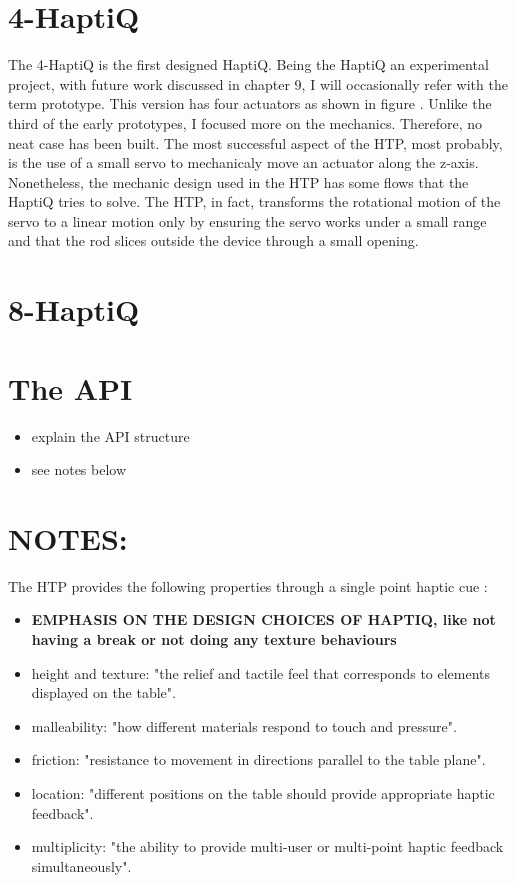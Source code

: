\section{4-HaptiQ}
The 4-HaptiQ is the first designed HaptiQ. Being the HaptiQ an experimental project, with future work discussed in chapter 9, I will occasionally refer with the term prototype. This version has four actuators as shown in figure . Unlike the third of the early prototypes, I focused more on the mechanics. Therefore, no neat case has been built. 
The most successful aspect of the HTP, most probably, is the use of a small servo to mechanicaly move an actuator along the z-axis. Nonetheless, the mechanic design used in the HTP has some flows that the HaptiQ tries to solve. The HTP, in fact, transforms the rotational motion of the servo to a linear motion only by ensuring the servo works under a small range and that the rod slices outside the device through a small opening. 


\section{8-HaptiQ}

\section{The API}

\begin{itemize}
	\item explain the API structure
    \item see notes below
\end{itemize}

\section{NOTES:}

 The HTP provides the following properties through a single point haptic cue  :
\begin{itemize}
\item \textbf{EMPHASIS ON THE DESIGN CHOICES OF HAPTIQ, like not having a break or not doing any texture behaviours}
	\item height and texture: "the relief and tactile feel that corresponds to elements displayed on the table".
    \item malleability: "how different materials respond to touch and pressure".
    \item friction: "resistance to movement in directions parallel to the table plane".
    \item location: "different positions on the table should provide appropriate haptic feedback".
    \item multiplicity: "the ability to provide multi-user or multi-point haptic feedback simultaneously". \cite{marquardt2009haptic}
\end{itemize}



